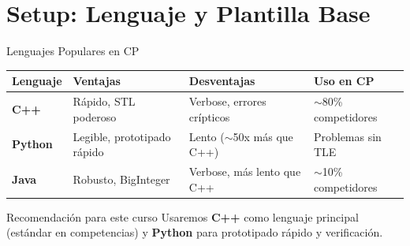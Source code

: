 \documentclass[aspectratio=169]{beamer}
\begin{document}
\section{Setup: Lenguaje y Plantilla Base}
\begin{frame}{Lenguajes Populares en CP}
    \begin{table}[]
        \centering
        \renewcommand{\arraystretch}{1.3}
        \scriptsize
        \begin{tabular}{p{2cm} p{3.5cm} p{3.5cm} p{2.5cm}}
            \toprule
            \textbf{Lenguaje} & \textbf{Ventajas} & \textbf{Desventajas} & \textbf{Uso en CP} \\
            \midrule
            \textbf{C++} & Rápido, STL poderoso & Verbose, errores crípticos & $\sim$80\% competidores \\
            \textbf{Python} & Legible, prototipado rápido & Lento ($\sim$50x más que C++) & Problemas sin TLE \\
            \textbf{Java} & Robusto, BigInteger & Verbose, más lento que C++ & $\sim$10\% competidores \\
            \bottomrule
        \end{tabular}
    \end{table}
    
    \vspace{0.2cm}
    \begin{block}{Recomendación para este curso}
        Usaremos \textbf{C++} como lenguaje principal (estándar en competencias) y \textbf{Python} para prototipado rápido y verificación.
    \end{block}
\end{frame}

\end{document}
